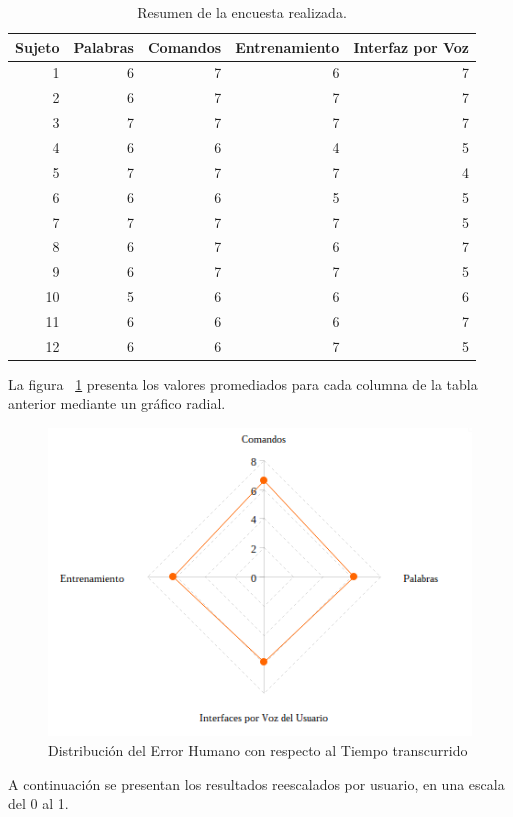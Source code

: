 \begin{table}[H] 
\centering
\footnotesize
\begin{tabular}{|r|r|r|r|r|}
\hline
    Sujeto & Palabras & Comandos & Entrenamiento & Interfaz por Voz \\
    \hline
    1 & 6 & 7 & 6 & 7 \\
    2 & 6 & 7 & 7 & 7 \\
    3 & 7 & 7 & 7 & 7 \\
    4 & 6 & 6 & 4 & 5 \\
    5 & 7 & 7 & 7 & 4 \\
    6 & 6 & 6 & 5 & 5 \\
    7 & 7 & 7 & 7 & 5 \\
    8 & 6 & 7 & 6 & 7  \\
    9 & 6 & 7 & 7 & 5  \\
    10 & 5 & 6 & 6 & 6  \\
    11 & 6 & 6 & 6 & 7  \\
    12 & 6 & 6 & 7 & 5  \\
\hline
\end{tabular}
\caption{Resumen de la encuesta realizada.}
\label{sec:tabla-encuesta}
\end{table}

La figura ~\ref{figure:kiviat-encuesta1} presenta los valores promediados para cada columna
de la tabla anterior mediante un gr\'afico radial.

\begin{figure}[ht]
\centering
\includegraphics[width=0.6\linewidth]{./graphics/kiviat0.png}
\caption{Distribuci\'on del Error Humano con respecto al Tiempo transcurrido}
\label{figure:kiviat-encuesta1}
\end{figure}

A continuaci\'on se presentan los resultados reescalados por usuario, en una escala del 0 al 1.


